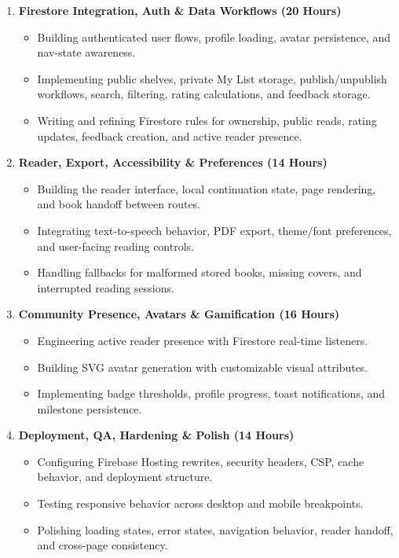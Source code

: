\documentclass[11pt, a4paper]{article}
\begin{document}
\begin{enumerate}[label=\textcolor{abookigold}{\textbf{\arabic*.}}]
    \item \textbf{Firestore Integration, Auth \& Data Workflows (20 Hours)}
    \begin{itemize}[label=\textcolor{abookipaper}{\textbullet}]
        \item Building authenticated user flows, profile loading, avatar persistence, and nav-state awareness.
        \item Implementing public shelves, private My List storage, publish/unpublish workflows, search, filtering, rating calculations, and feedback storage.
        \item Writing and refining Firestore rules for ownership, public reads, rating updates, feedback creation, and active reader presence.
    \end{itemize}

    \item \textbf{Reader, Export, Accessibility \& Preferences (14 Hours)}
    \begin{itemize}[label=\textcolor{abookipaper}{\textbullet}]
        \item Building the reader interface, local continuation state, page rendering, and book handoff between routes.
        \item Integrating text-to-speech behavior, PDF export, theme/font preferences, and user-facing reading controls.
        \item Handling fallbacks for malformed stored books, missing covers, and interrupted reading sessions.
    \end{itemize}

    \item \textbf{Community Presence, Avatars \& Gamification (16 Hours)}
    \begin{itemize}[label=\textcolor{abookipaper}{\textbullet}]
        \item Engineering active reader presence with Firestore real-time listeners.
        \item Building SVG avatar generation with customizable visual attributes.
        \item Implementing badge thresholds, profile progress, toast notifications, and milestone persistence.
    \end{itemize}

    \item \textbf{Deployment, QA, Hardening \& Polish (14 Hours)}
    \begin{itemize}[label=\textcolor{abookipaper}{\textbullet}]
        \item Configuring Firebase Hosting rewrites, security headers, CSP, cache behavior, and deployment structure.
        \item Testing responsive behavior across desktop and mobile breakpoints.
        \item Polishing loading states, error states, navigation behavior, reader handoff, and cross-page consistency.
    \end{itemize}
\end{enumerate}
\end{document}
